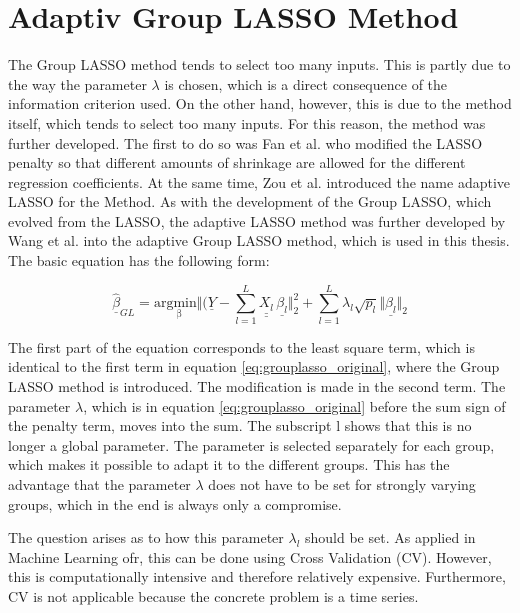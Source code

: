 \section{Adaptiv Group LASSO Method}
\label{sec:Adaptive_Group_LASSO}

The Group LASSO method tends to select too many inputs. This is partly due to the way the parameter $\lambda$ is chosen, which is a direct consequence of the information criterion used. 
On the other hand, however, this is due to the method itself, which tends to select too many inputs. For this reason, the method was further developed. The first to do so was Fan et al.\cite{Fan2006} who modified the LASSO penalty so that different amounts of shrinkage are allowed for the different regression coefficients. At the same time, Zou et al. \cite{Zou_2006} introduced the name adaptive LASSO for the Method. As with the development of the Group LASSO, which evolved from the LASSO, the adaptive LASSO method was further developed by Wang et al. \cite{Wang_2008} into the adaptive Group LASSO method, which is used in this thesis. The basic equation has the following form:

 \begin{equation}
	\hat{\underline{\beta}}_{GL} = \mathrm{arg \underset{\beta} min} \Vert  (\underline{Y} - \sum_{l=1}^L \underline{\underline{X_l}} \, \underline{\beta_l} \Vert^2_2 + \sum_{l=1}^L \lambda_l \sqrt{p_l} \Vert \underline{\beta_l} \Vert_2
	\label{eq:original_adaptive_grouplasso_1}
\end{equation}

The first part of the equation corresponds to the least square term, which is identical to the first term in equation \ref{eq:grouplasso_original}, where the Group LASSO method is introduced. The modification is made in the second term. The parameter $\lambda$, which is in equation \ref{eq:grouplasso_original} before the sum sign of the penalty term, moves into the sum. The subscript l shows that this is no longer a global parameter. The parameter is selected separately for each group, which makes it possible to adapt it to the different groups. This has the advantage that the parameter $\lambda$ does not have to be set for strongly varying groups, which in the end is always only a compromise. 

The question arises as to how this parameter $\lambda_l$ should be set. As applied in Machine Learning ofr, this can be done using Cross Validation (CV). However, this is computationally intensive and therefore relatively expensive.  Furthermore, CV is not applicable because the concrete problem is a time series.

